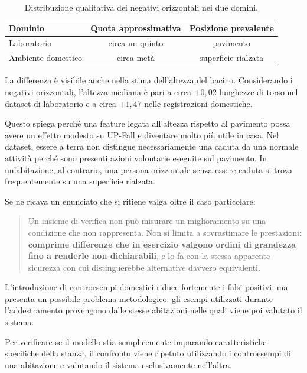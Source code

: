 \begin{table}[ht]
\centering
\caption{Distribuzione qualitativa dei negativi orizzontali nei due domini.}
\label{tab:orizzontali}
\begin{tabular}{lcc}
\toprule
\textbf{Dominio} & \textbf{Quota approssimativa} &
\textbf{Posizione prevalente} \\
\midrule
Laboratorio & circa un quinto & pavimento \\
Ambiente domestico & circa metà & superficie rialzata \\
\bottomrule
\end{tabular}
\end{table}

La differenza è visibile anche nella stima dell'altezza del bacino. Considerando i negativi orizzontali, l'altezza mediana è pari a circa $+0{,}02$ lunghezze di torso nel dataset di laboratorio e a circa $+1{,}47$ nelle registrazioni domestiche.

Questo spiega perché una feature legata all'altezza rispetto al pavimento possa avere un effetto modesto su UP-Fall e diventare molto più utile in casa. Nel dataset, essere a terra non distingue necessariamente una caduta da una normale attività perché sono presenti azioni volontarie eseguite sul pavimento. In un'abitazione, al contrario, una persona orizzontale senza essere caduta si trova frequentemente su una superficie rialzata.

Se ne ricava un enunciato che si ritiene valga oltre il caso particolare:

\begin{quote}
Un insieme di verifica non può misurare un miglioramento su una condizione che
non rappresenta. Non si limita a sovrastimare le prestazioni: \textbf{comprime
differenze che in esercizio valgono ordini di grandezza fino a renderle non
dichiarabili}, e lo fa con la stessa apparente sicurezza con cui
distinguerebbe alternative davvero equivalenti.
\end{quote}

L'introduzione di controesempi domestici riduce fortemente i falsi positivi, ma presenta un possibile problema metodologico: gli esempi utilizzati durante l'addestramento provengono dalle stesse abitazioni nelle quali viene poi valutato il sistema.

Per verificare se il modello stia semplicemente imparando caratteristiche specifiche della stanza, il confronto viene ripetuto utilizzando i controesempi di una abitazione e valutando il sistema esclusivamente nell'altra.

